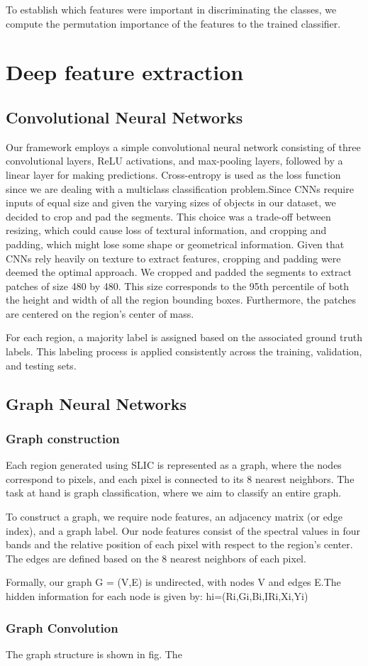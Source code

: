To establish which features were important in discriminating the classes, we compute the permutation importance of the features to the trained classifier.

\section{Deep feature extraction}
\subsection{Convolutional Neural Networks}
 Our framework employs a simple convolutional neural network consisting of three convolutional layers, ReLU activations, and max-pooling layers, followed by a linear layer for making predictions. Cross-entropy is used as the loss function since we are dealing with a multiclass classification problem.Since CNNs require inputs of equal size and given the varying sizes of objects in our dataset, we decided to crop and pad the segments. This choice was a trade-off between resizing, which could cause loss of textural information, and cropping and padding, which might lose some shape or geometrical information. Given that CNNs rely heavily on texture to extract features, cropping and padding were deemed the optimal approach. We cropped and padded the segments to extract patches of size 480 by 480. This size corresponds to the 95th percentile of both the height and width of all the region bounding boxes. Furthermore, the patches are centered on the region's center of mass.

For each region, a majority label is assigned based on the associated ground truth labels. This labeling process is applied consistently across the training, validation, and testing sets.
 
\subsection{Graph Neural Networks}
\subsubsection{Graph construction}
Each region generated using SLIC \cite{achanta_slic_2012} is represented as a graph, where the nodes correspond to pixels, and each pixel is connected to its 8 nearest neighbors. The task at hand is graph classification, where we aim to classify an entire graph.

To construct a graph, we require node features, an adjacency matrix (or edge index), and a graph label. Our node features consist of the spectral values in four bands and the relative position of each pixel with respect to the region's center. The edges are defined based on the 8 nearest neighbors of each pixel.

Formally, our graph G = (V,E) is undirected, with nodes V and edges E.The hidden information for each node is given by:
hi=(Ri,Gi,Bi,IRi,Xi,Yi)


\subsubsection{Graph Convolution}
The graph structure is shown in fig. The 




